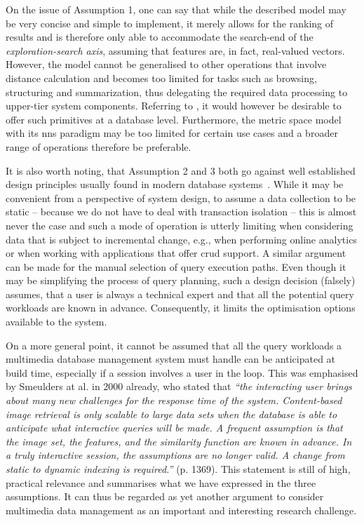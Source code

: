 On the issue of Assumption 1, one can say that while the described model may be very concise and simple to implement, it merely allows for the ranking of results and is therefore only able to accommodate the search-end of the \emph{exploration-search axis}, assuming that features are, in fact, real-valued vectors. However, the model cannot be generalised to other operations that involve distance calculation and becomes too limited for tasks such as browsing, structuring and summarization, thus delegating the required data processing to upper-tier system components. Referring to \cite{Jonsson:2016Ten}, it would however be desirable to offer such primitives at a database level. Furthermore, the metric space model with its \acrfull{nns} paradigm may be too limited for certain use cases and a broader range of operations therefore be preferable.

It is also worth noting, that Assumption 2 and 3 both go against well established design principles usually found in modern database systems~\cite{Petrov:2019Database,Amsaleg:2014Database}. While it may be convenient from a perspective of system design, to assume a data collection to be static -- because we do not have to deal with transaction isolation -- this is almost never the case and such a mode of operation is utterly limiting when considering data that is subject to incremental change, e.g., when performing online analytics or when working with applications that offer \acrshort{crud} support. A similar argument can be made for the manual selection of query execution paths. Even though it may be simplifying the process of query planning, such a design decision (falsely) assumes, that a user is always a technical expert and that all the potential query workloads are known in advance. Consequently, it limits the optimisation options available to the system. 

On a more general point, it cannot be assumed that all the query workloads a multimedia database management system must handle can be anticipated at build time, especially if a session involves a user in the loop. This was emphasised by Smeulders at al. in 2000 already, who stated that \emph{``the interacting user brings about many new challenges for the response time of the system. Content-based image retrieval is only scalable to large data sets when the database is able to anticipate what interactive queries will be made. A frequent assumption is that the image set, the features, and the similarity function are known in advance. In a truly interactive session, the assumptions are no longer valid. A change from static to dynamic indexing is required.''} \cite{Smeulders:2000Content} (p. 1369). This statement is still of high, practical relevance and summarises what we have expressed in the three assumptions. It can thus be regarded as yet another argument to consider multimedia data management as an important and interesting research challenge.


